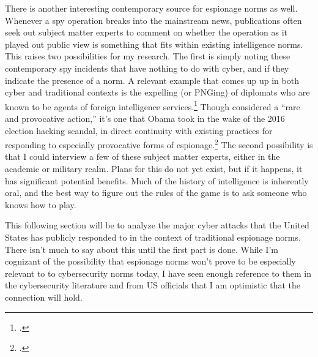 \documentclass[12pt]{article}
\begin{document}
There is another interesting contemporary source for espionage norms as well. Whenever a spy operation breaks into the mainstream news, publications often seek out subject matter experts to comment on whether the operation as it played out public view is something that fits within existing intelligence norms. This raises two possibilities for my research. The first is simply noting these contemporary spy incidents that have nothing to do with cyber, and if they indicate the presence of a norm. A relevant example that comes up up in both cyber and traditional contexts is the expelling (or PNGing) of diplomats who are known to be agents of foreign intelligence services.\footcite{risen_rules_2001} Though considered a ``rare and provocative action,'' it's one that Obama took in the wake of the 2016 election hacking scandal, in direct continuity with existing practices for responding to especially provocative forms of espionage.\footcite{mazzetti_game_2017} The second possibility is that I could interview a few of these subject matter experts, either in the academic or military realm. Plans for this do not yet exist, but if it happens, it has significant potential benefits. Much of the history of intelligence is inherently oral, and the best way to figure out the rules of the game is to ask someone who knows how to play. 

This following section will be to analyze the major cyber attacks that the United States has publicly responded to in the context of traditional espionage norms. There isn't much to say about this until the first part is done. While I'm cognizant of the possibility that espionage norms won't prove to be especially relevant to to cybersecurity norms today, I have seen enough reference to them in the cybersecurity literature and from US officials that I am optimistic that the connection will hold.

\newpage
\printbibliography
\end{document}
